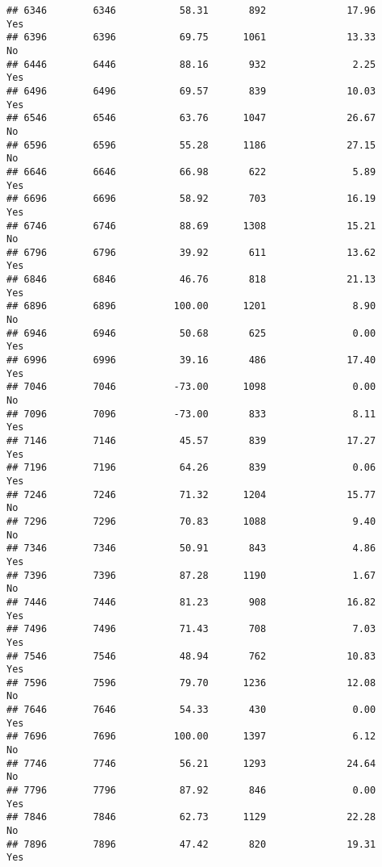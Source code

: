 \documentclass[
]{article}
\begin{document}
\begin{verbatim}
## 6346        6346           58.31       892              17.96               Yes
## 6396        6396           69.75      1061              13.33                No
## 6446        6446           88.16       932               2.25               Yes
## 6496        6496           69.57       839              10.03               Yes
## 6546        6546           63.76      1047              26.67                No
## 6596        6596           55.28      1186              27.15                No
## 6646        6646           66.98       622               5.89               Yes
## 6696        6696           58.92       703              16.19               Yes
## 6746        6746           88.69      1308              15.21                No
## 6796        6796           39.92       611              13.62               Yes
## 6846        6846           46.76       818              21.13               Yes
## 6896        6896          100.00      1201               8.90                No
## 6946        6946           50.68       625               0.00               Yes
## 6996        6996           39.16       486              17.40               Yes
## 7046        7046          -73.00      1098               0.00                No
## 7096        7096          -73.00       833               8.11               Yes
## 7146        7146           45.57       839              17.27               Yes
## 7196        7196           64.26       839               0.06               Yes
## 7246        7246           71.32      1204              15.77                No
## 7296        7296           70.83      1088               9.40                No
## 7346        7346           50.91       843               4.86               Yes
## 7396        7396           87.28      1190               1.67                No
## 7446        7446           81.23       908              16.82               Yes
## 7496        7496           71.43       708               7.03               Yes
## 7546        7546           48.94       762              10.83               Yes
## 7596        7596           79.70      1236              12.08                No
## 7646        7646           54.33       430               0.00               Yes
## 7696        7696          100.00      1397               6.12                No
## 7746        7746           56.21      1293              24.64                No
## 7796        7796           87.92       846               0.00               Yes
## 7846        7846           62.73      1129              22.28                No
## 7896        7896           47.42       820              19.31               Yes

\end{verbatim}
\end{document}
